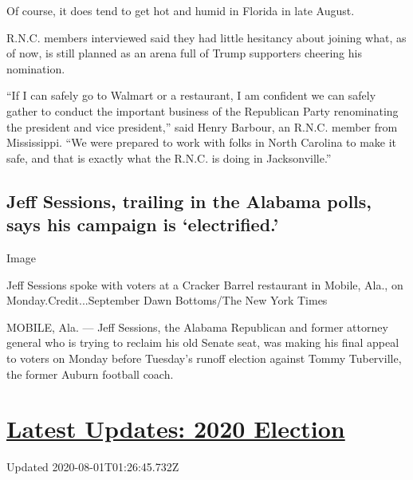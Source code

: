Of course, it does tend to get hot and humid in Florida in late August.

R.N.C. members interviewed said they had little hesitancy about joining
what, as of now, is still planned as an arena full of Trump supporters
cheering his nomination.

``If I can safely go to Walmart or a restaurant, I am confident we can
safely gather to conduct the important business of the Republican Party
renominating the president and vice president,'' said Henry Barbour, an
R.N.C. member from Mississippi. ``We were prepared to work with folks in
North Carolina to make it safe, and that is exactly what the R.N.C. is
doing in Jacksonville.''

\hypertarget{jeff-sessions-trailing-in-the-alabama-polls-says-his-campaign-is-electrified}{%
\subsection{Jeff Sessions, trailing in the Alabama polls, says his
campaign is
`electrified.'}\label{jeff-sessions-trailing-in-the-alabama-polls-says-his-campaign-is-electrified}}

Image

Jeff Sessions spoke with voters at a Cracker Barrel restaurant in
Mobile, Ala., on Monday.Credit...September Dawn Bottoms/The New York
Times

MOBILE, Ala. --- Jeff Sessions, the Alabama Republican and former
attorney general who is trying to reclaim his old Senate seat, was
making his final appeal to voters on Monday before Tuesday's runoff
election against Tommy Tuberville, the former Auburn football coach.

\hypertarget{latest-updates-2020-election}{%
\section{\texorpdfstring{\href{https://www.nytimes.com/2020/07/31/us/elections/biden-vs-trump.html?action=click\&pgtype=Article\&state=default\&region=MAIN_CONTENT_1\&context=storylines_live_updates}{Latest
Updates: 2020
Election}}{Latest Updates: 2020 Election}}\label{latest-updates-2020-election}}

Updated 2020-08-01T01:26:45.732Z

